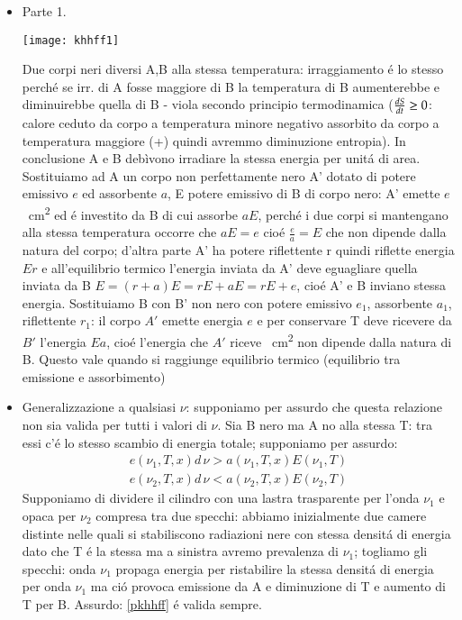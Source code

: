                 \begin{itemize}
                    \item Parte 1.
                        \begin{minipage}{0.5\linewidth}
                            \centering
                            \texttt{[image: khhff1]}
                        \end{minipage}
                        Due corpi neri diversi A,B alla stessa temperatura: irraggiamento \'e lo stesso perch\'e se irr. di A fosse maggiore di B la temperatura di B aumenterebbe e diminuirebbe quella di B  - viola secondo principio termodinamica ($\TDy{t}{S}\geq0$: calore ceduto da corpo a temperatura minore negativo assorbito da corpo a temperatura maggiore (+) quindi avremmo diminuzione entropia). In conclusione A e B debìvono irradiare la stessa energia per unit\'a di area.
                        Sostituiamo ad A un corpo non perfettamente nero A' dotato di potere emissivo $e$ ed assorbente $a$, E potere emissivo di B di corpo nero: A' emette $e$ \si{\per\square\cm} ed \'e investito da B di cui assorbe $aE$, perch\'e i due corpi si mantengano alla stessa temperatura occorre che $aE=e$ cio\'e $\frac{e}{a}=E$ che non dipende dalla natura del corpo; d'altra parte A' ha potere riflettente r quindi riflette energia $Er$ e all'equilibrio termico l'energia inviata da A' deve eguagliare quella inviata da B $E=(r+a)E=rE+aE=rE+e$, cio\'e A' e B inviano stessa energia.
                        Sostituiamo B con B' non nero con potere emissivo $e_1$, assorbente $a_1$, riflettente $r_1$: il corpo $A'$ emette energia $e$ e per conservare T deve ricevere da $B'$ l'energia $Ea$, cio\'e l'energia che $A'$ riceve \si{\per\square\cm} non dipende dalla natura di B.
                        Questo vale quando si raggiunge equilibrio termico (equilibrio tra emissione e assorbimento)
                    \item Generalizzazione a qualsiasi $\nu$: supponiamo per assurdo che questa relazione non sia valida per tutti i valori di $\nu$. Sia B nero ma A no alla stessa T: tra essi c'\'e lo stesso scambio di energia totale; supponiamo per assurdo:
                        \begin{align*}
                            e(\nu_1,T,x)d\,\nu>a(\nu_1,T,x)E(\nu_1,T)\\
                            e(\nu_2,T,x)d\,\nu<a(\nu_2,T,x)E(\nu_2,T)%
                        \end{align*}
                        Supponiamo di dividere il cilindro con una lastra trasparente per l'onda $\nu_1$ e opaca per $\nu_2$ compresa tra due specchi: abbiamo inizialmente due camere distinte nelle quali si stabiliscono radiazioni nere con stessa densit\'a di energia dato che T \'e la stessa ma a sinistra avremo prevalenza di $\nu_1$; togliamo gli specchi: onda $\nu_1$ propaga energia per ristabilire la stessa densit\'a di energia per onda $\nu_1$ ma ci\'o provoca emissione da A e diminuzione di T e aumento di T per B. Assurdo: \ref{pkhhff} \'e valida sempre.
                \end{itemize}

